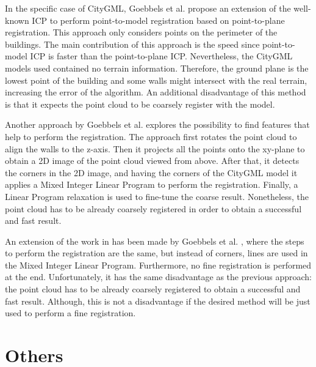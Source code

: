         In the specific case of CityGML, Goebbels et al. \cite{Goebbels_2019_icpcitygml} propose an extension of the well-known ICP
        to perform point-to-model registration based on point-to-plane registration.
        This approach only considers points on the perimeter of the buildings.
        The main contribution of this approach is the speed since point-to-model ICP is faster than the point-to-plane ICP.
        Nevertheless, the CityGML models used contained no terrain information. 
        Therefore, the ground plane is the lowest point of the building and some walls might intersect with the real terrain, increasing the error of the algorithm.
        An additional disadvantage of this method is that it expects the point cloud to be coarsely register with the model.

        Another approach by Goebbels et al. \cite{Goebbels_2018_alinear} explores the possibility to find features that help to perform the registration.
        The approach first rotates the point cloud to align the walls to the z-axis. Then it projects all the points onto the 
        xy-plane to obtain a 2D image of the point cloud viewed from above. After that, it detects the corners in the 2D image,
        and having the corners of the CityGML model it applies a Mixed Integer Linear Program to perform the registration.
        Finally, a Linear Program relaxation is used to fine-tune the coarse result. 
        Nonetheless, the point cloud has to be already coarsely registered in order to obtain a successful and fast result.

        An extension of the work in \cite{Goebbels_2018_alinear} has been made by Goebbels et al. \cite{Goebbels_2018_linebased}, 
        where the steps to perform the registration are the same, but instead of corners, lines are used in the Mixed Integer Linear Program. 
        Furthermore, no fine registration is performed at the end.
        Unfortunately, it has the same disadvantage as the previous approach: the point cloud has to be already coarsely registered to obtain a successful and fast result.
        Although, this is not a disadvantage if the desired method will be just used to perform a fine registration.

    \section{Others} 


